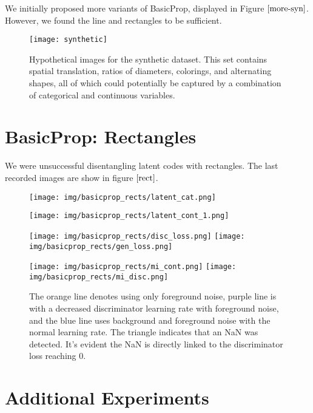 \documentclass{article}
\begin{document}
We initially proposed more variants of BasicProp, displayed in Figure $\ref{more-syn}$. However, we found the line and rectangles to be sufficient.

\begin{figure}[ht]
    \centering
    \texttt{[image: synthetic]}
    \caption{Hypothetical images for the synthetic dataset. This set contains spatial translation, ratios of diameters, colorings, and alternating shapes, all of which could potentially be captured by a combination of categorical and continuous variables.}
    \label{more-syn}
\end{figure}

\section{BasicProp: Rectangles}

We were unsuccessful disentangling latent codes with rectangles. The last recorded images are show in figure $\ref{rect}$.

\begin{figure}[ht]
\centering
\begin{multicols}{2}



\texttt{[image: img/basicprop\_rects/latent\_cat.png]}


\texttt{[image: img/basicprop\_rects/latent\_cont\_1.png]}


\texttt{[image: img/basicprop\_rects/disc\_loss.png]}
\texttt{[image: img/basicprop\_rects/gen\_loss.png]}

\texttt{[image: img/basicprop\_rects/mi\_cont.png]}
\texttt{[image: img/basicprop\_rects/mi\_disc.png]}

\end{multicols}
\caption{The orange line denotes using only foreground noise, purple line is with a decreased discriminator learning rate with foreground noise, and the blue line uses background and foreground noise with the normal learning rate. The triangle indicates that an NaN was detected. It's evident the NaN is directly linked to the discriminator loss reaching 0.}
    \label{rect}
\end{figure}

\section{Additional Experiments}
\end{document}
